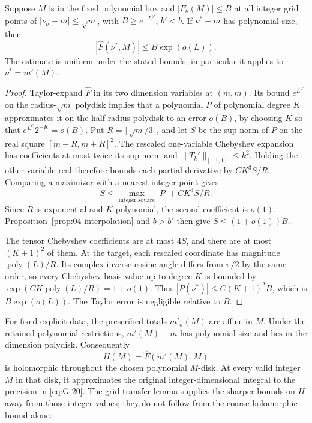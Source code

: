 \begin{lemma}\label{lem:04-grid}
Suppose \(M\) is in the fixed polynomial box and
\(|F_\nu(M)|\le B\) at all integer grid points of
\(|\nu_\sigma-m|\le\sqrt m\), with
\(B\ge e^{-L^{b'}}\), \(b'<b\). If \(\nu^*-m\) has polynomial
size, then
\begin{equation}
 |\widehat F(\nu^*,M)|\le B\exp(o(L)).
 \label{eq:G-21}
\end{equation}
The estimate is uniform under the stated bounds; in particular it
applies to \(\nu^*=m'(M)\).
\end{lemma}

\begin{proof}
Taylor-expand \(\widehat F\) in its two dimension variables at
\((m,m)\). Its bound \(e^{L^C}\) on the radius-\(\sqrt m\)
polydisk implies that a polynomial \(P\) of polynomial degree
\(K\) approximates it on the half-radius polydisk to an error
\(o(B)\), by choosing \(K\) so that \(e^{L^C}2^{-K}=o(B)\).
Put \(R=\lfloor\sqrt m/3\rfloor\), and let \(S\) be the sup norm
of \(P\) on the real square \([m-R,m+R]^2\).
The rescaled one-variable Chebyshev expansion has coefficients at
most twice its sup norm and \(\|T_k'\|_{[-1,1]}\le k^2\).
Holding the other variable real therefore bounds each partial
derivative by \(CK^3S/R\). Comparing a maximizer with a nearest
integer point gives
\[
 S\le \max_{\text{integer square}}|P|+CK^3S/R.
\]
Since \(R\) is exponential and \(K\) polynomial, the second
coefficient is \(o(1)\). Proposition~\ref{prop:04-interpolation}
and \(b>b'\) then give \(S\le(1+o(1))B\).

The tensor Chebyshev coefficients are at most \(4S\), and there
are at most \((K+1)^2\) of them. At the target, each rescaled
coordinate has magnitude \(\operatorname{poly}(L)/R\). Its
complex inverse-cosine angle differs from \(\pi/2\) by the same
order, so every Chebyshev basis value up to degree \(K\) is
bounded by \(\exp(CK\operatorname{poly}(L)/R)=1+o(1)\).
Thus \(|P(\nu^*)|\le C(K+1)^2B\), which is
\(B\exp(o(L))\). The Taylor error is negligible relative to \(B\).
\end{proof}

For fixed explicit data, the prescribed totals \(m'_\sigma(M)\)
are affine in \(M\). Under the retained polynomial restrictions,
\(m'(M)-m\) has polynomial size and lies in the dimension polydisk.
Consequently
\[
 H(M)=\widehat F(m'(M),M)
\]
is holomorphic throughout the chosen polynomial \(M\)-disk. At every
valid integer \(M\) in that disk, it approximates the original
integer-dimensional integral to the precision in \eqref{eq:G-20}.
The grid-transfer lemma supplies the sharper bounds on \(H\) away
from those integer values; they do not follow from the coarse
holomorphic bound alone.

